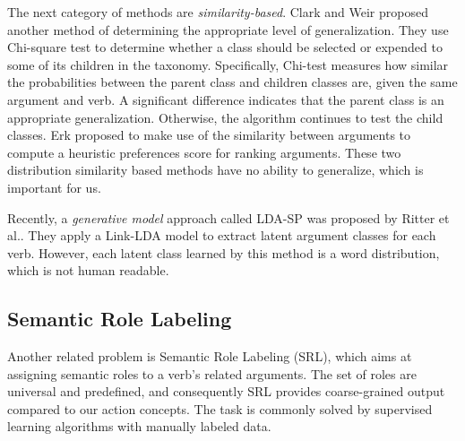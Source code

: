 The next category of methods are {\em similarity-based}.
Clark and Weir\cite{clark2001class} proposed another method
of determining the appropriate level of generalization.
They use Chi-square test to determine whether a class should
be selected or expended to some of its children in the taxonomy. Specifically,
Chi-test measures how similar the probabilities between the parent class
and children classes are, given the same argument and verb.
A significant difference indicates that the parent class is an appropriate
generalization. Otherwise, the algorithm
continues to test the child classes. Erk\cite{erk2007simple} proposed
to make use of the similarity between arguments to compute a
heuristic preferences score for ranking arguments.
These two distribution similarity based methods have no
ability to generalize, which is important for us.

Recently, a {\em generative model} approach called LDA-SP
was proposed by Ritter et al.\cite{Ritter:2010}. They apply a Link-LDA model
to extract latent argument classes for each verb. However,
each latent class learned by this method is a word distribution,
which is not human readable.



\subsection{Semantic Role Labeling}
Another related problem is Semantic Role Labeling (SRL), which aims at
assigning semantic roles to a verb's related arguments.
The set of roles are universal and predefined,
and consequently SRL provides coarse-grained output compared
to our action concepts. The task is commonly solved
by supervised learning algorithms with manually labeled data.

